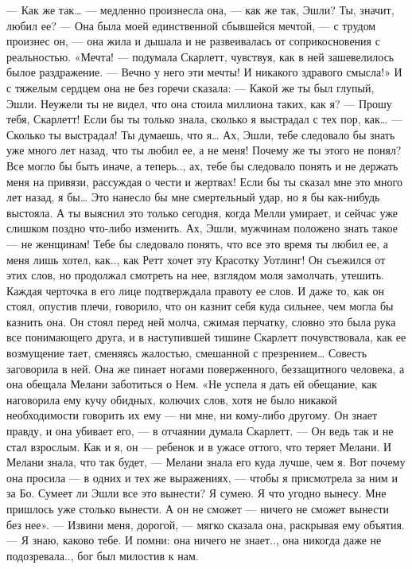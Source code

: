 — Как же так… — медленно произнесла она, — как же так, Эшли? Ты, значит, любил ее?
— Она была моей единственной сбывшейся мечтой, — с трудом произнес он, — она жила и дышала и не развеивалась от соприкосновения с реальностью.
«Мечта! — подумала Скарлетт, чувствуя, как в ней зашевелилось былое раздражение. — Вечно у него эти мечты! И никакого здравого смысла!» И с тяжелым сердцем она не без горечи сказала:
— Какой же ты был глупый, Эшли. Неужели ты не видел, что она стоила миллиона таких, как я?
— Прошу тебя, Скарлетт! Если бы ты только знала, сколько я выстрадал с тех пор, как…
— Сколько ты выстрадал! Ты думаешь, что я… Ах, Эшли, тебе следовало бы знать уже много лет назад, что ты любил ее, а не меня! Почему же ты этого не понял? Все могло бы быть иначе, а теперь.., ах, тебе бы следовало понять и не держать меня на привязи, рассуждая о чести и жертвах! Если бы ты сказал мне это много лет назад, я бы… Это нанесло бы мне смертельный удар, но я бы как-нибудь выстояла. А ты выяснил это только сегодня, когда Мелли умирает, и сейчас уже слишком поздно что-либо изменить. Ах, Эшли, мужчинам положено знать такое — не женщинам! Тебе бы следовало понять, что все это время ты любил ее, а меня лишь хотел, как.., как Ретт хочет эту Красотку Уотлинг!
Он съежился от этих слов, но продолжал смотреть на нее, взглядом моля замолчать, утешить. Каждая черточка в его лице подтверждала правоту ее слов. И даже то, как он стоял, опустив плечи, говорило, что он казнит себя куда сильнее, чем могла бы казнить она. Он стоял перед ней молча, сжимая перчатку, словно это была рука все понимающего друга, и в наступившей тишине Скарлетт почувствовала, как ее возмущение тает, сменяясь жалостью, смешанной с презрением… Совесть заговорила в ней. Она же пинает ногами поверженного, беззащитного человека, а она обещала Мелани заботиться о Нем. «Не успела я дать ей обещание, как наговорила ему кучу обидных, колючих слов, хотя не было никакой необходимости говорить их ему — ни мне, ни кому-либо другому. Он знает правду, и она убивает его, — в отчаянии думала Скарлетт. — Он ведь так и не стал взрослым. Как и я, он — ребенок и в ужасе оттого, что теряет Мелани. И Мелани знала, что так будет, — Мелани знала его куда лучше, чем я. Вот почему она просила — в одних и тех же выражениях, — чтобы я присмотрела за ним и за Бо. Сумеет ли Эшли все это вынести? Я сумею. Я что угодно вынесу. Мне пришлось уже столько вынести. А он не сможет — ничего не сможет вынести без нее».
— Извини меня, дорогой, — мягко сказала она, раскрывая ему объятия. — Я знаю, каково тебе. И помни: она ничего не знает.., она никогда даже не подозревала.., бог был милостив к нам.
